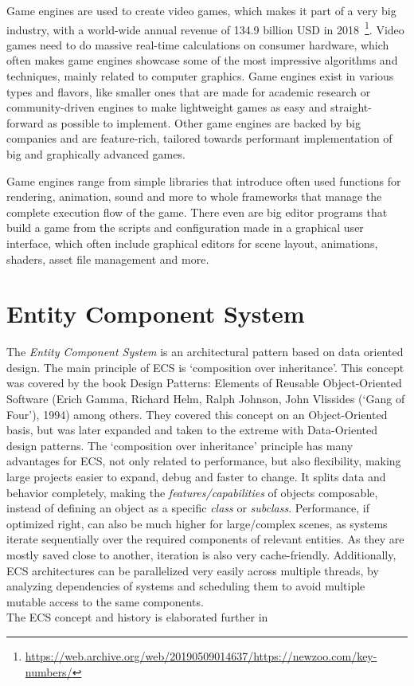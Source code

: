 
Game engines are used to create video games, which makes it part of a very big industry, with a world-wide annual revenue of 134.9 billion USD in 2018~\footnote{\url{https://web.archive.org/web/20190509014637/https://newzoo.com/key-numbers/}}. Video games need to do massive real-time calculations on consumer hardware, which often makes game engines showcase some of the most impressive algorithms and techniques, mainly related to computer graphics. Game engines exist in various types and flavors, like smaller ones that are made for academic research or community-driven engines to make lightweight games as easy and straight-forward as possible to implement. Other game engines are backed by big companies and are feature-rich, tailored towards performant implementation of big and graphically advanced games.

Game engines range from simple libraries that introduce often used functions for rendering, animation, sound and more to whole frameworks that manage the complete execution flow of the game. There even are big editor programs that build a game from the scripts and configuration made in a graphical user interface, which often include graphical editors for scene layout, animations, shaders, asset file management and more.

\section*{Entity Component System}

The \textit{Entity Component System} is an architectural pattern based on data oriented design. The main principle of ECS is `composition over inheritance'. This concept was covered by the book \textsf{Design Patterns: Elements of Reusable Object-Oriented Software} (Erich Gamma, Richard Helm, Ralph Johnson, John Vlissides (`Gang of Four'), 1994) among others. They covered this concept on an Object-Oriented basis, but was later expanded and taken to the extreme with Data-Oriented design patterns. The `composition over inheritance' principle has many advantages for ECS, not only related to performance, but also flexibility, making large projects easier to expand, debug and faster to change. It splits data and behavior completely, making the \textit{features/capabilities} of objects composable, instead of defining an object as a specific \textit{class} or \textit{subclass}. Performance, if optimized right, can also be much higher for large/complex scenes, as systems iterate sequentially over the required components of relevant entities. As they are mostly saved close to another, iteration is also very cache-friendly. Additionally, ECS architectures can be parallelized very easily across multiple threads, by analyzing dependencies of systems and scheduling them to avoid multiple mutable access to the same components.\\
The ECS concept and history is elaborated further in 

